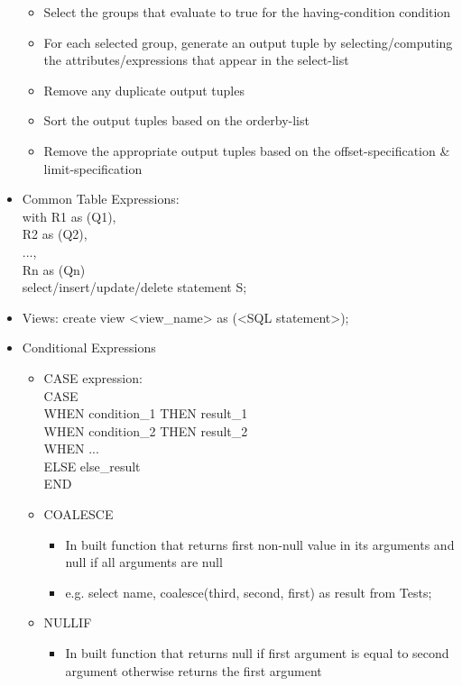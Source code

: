 \documentclass[10pt,landscape,a4paper]{scrartcl}
\begin{document}
\begin{multicols*}{4}
\begin{itemize}
\begin{itemize}
        \item Select the groups that evaluate to true for the having-condition condition
        \item For each selected group, generate an output tuple by selecting/computing the
              attributes/expressions that appear in the select-list
        \item Remove any duplicate output tuples
        \item Sort the output tuples based on the orderby-list
        \item Remove the appropriate output tuples based on the offset-specification \& limit-specification
      \end{itemize}
      \item Common Table Expressions: \\
      with 
        R1 as (Q1), \\
        R2 as (Q2), \\
        ..., \\
        Rn as (Qn) \\
        select/insert/update/delete statement S; \\
      \item Views: create view <view\_name> as (<SQL statement>);
      \item Conditional Expressions
      \begin{itemize}
          \item CASE expression: \\
          CASE \\
              WHEN condition\_1  THEN result\_1 \\
              WHEN condition\_2  THEN result\_2 \\
              WHEN ...\, \\
              ELSE else\_result \\
          END
          \item COALESCE
          \begin{itemize}
            \item In built function that returns first non-null value in its arguments and null if all arguments are null
            \item e.g. select name, coalesce(third, second, first) as result from Tests;
          \end{itemize}
          \item NULLIF
          \begin{itemize}
            \item In built function that returns null if first argument is equal to second argument otherwise returns the first argument

\end{itemize}
\end{itemize}
\end{itemize}
\end{multicols*}
\end{document}
